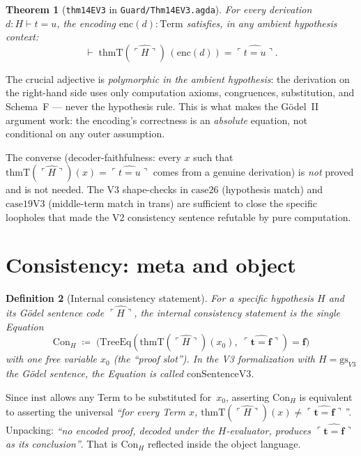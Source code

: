 \documentclass[11pt]{article}
\newtheorem{theorem}{Theorem}
\newtheorem{definition}[theorem]{Definition}
\newcommand{\trueT}{\mathbf{t}}
\newcommand{\falseT}{\mathbf{f}}
\newcommand{\code}[1]{\ulcorner #1 \urcorner}
\newcommand{\reify}[1]{\widehat{#1}}
\newcommand{\thmT}{\mathrm{thmT}}
\newcommand{\TreeEq}{\mathrm{TreeEq}}
\begin{document}
\begin{theorem}[\texttt{thm14EV3} in \texttt{Guard/Thm14EV3.agda}]
\label{thm:thm14v3}
For every derivation $d : H \vdash t = u$, the encoding
$\mathrm{enc}(d) : \mathrm{Term}$ satisfies, in any ambient
hypothesis context:
\[
  \vdash \;\thmT(\reify{\code{H}})\,(\mathrm{enc}(d)) = \reify{\code{t = u}}.
\]
\end{theorem}

The crucial adjective is \emph{polymorphic in the ambient
hypothesis}: the derivation on the right-hand side uses only
computation axioms, congruences, substitution, and Schema~F ---
never the hypothesis rule.  This is what makes the G\"odel~II
argument work: the encoding's correctness is an \emph{absolute}
equation, not conditional on any outer assumption.

The converse (decoder-faithfulness: every $x$ such that
$\thmT(\reify{\code{H}})(x) = \reify{\code{t=u}}$ comes from a
genuine derivation) is \emph{not} proved and is not needed.  The V3
shape-checks in $\mathrm{case26}$ (hypothesis match) and
$\mathrm{case19V3}$ (middle-term match in trans) are sufficient to
close the specific loopholes that made the V2 consistency sentence
refutable by pure computation.

\section{Consistency: meta and object}
\label{sec:consistency}

\begin{definition}[Internal consistency statement]
\label{def:conV3}
For a specific hypothesis $H$ and its G\"odel sentence code
$\reify{\code{H}}$, the \emph{internal consistency statement} is
the single Equation
\[
  \mathrm{Con}_H \;\coloneqq\;
  \bigl(\TreeEq(\thmT(\reify{\code{H}})(x_0),\;
               \reify{\code{\trueT = \falseT}}) = \falseT\bigr)
\]
with one free variable $x_0$ (the ``proof slot'').  In the V3
formalization with $H = \mathrm{gs}_{V3}$ the G\"odel sentence, the
Equation is called $\mathrm{conSentenceV3}$.
\end{definition}

Since $\mathrm{inst}$ allows any Term to be substituted for~$x_0$,
asserting $\mathrm{Con}_H$ is equivalent to asserting the universal
\emph{``for every Term $x$, $\thmT(\reify{\code{H}})(x) \neq
\reify{\code{\trueT = \falseT}}$''}.  Unpacking:
\emph{``no encoded proof, decoded under the $H$-evaluator,
produces $\reify{\code{\trueT = \falseT}}$ as its conclusion''}.
That is $\mathrm{Con}_H$ reflected inside the object language.
\end{document}
